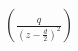 \documentclass[preview]{standalone}
\begin{document}
\begin{align*}
\left ({ \frac{q}{\left ( z-\frac{d}{2} \right )^{2}} }\right )
\end{align*}
\end{document}
